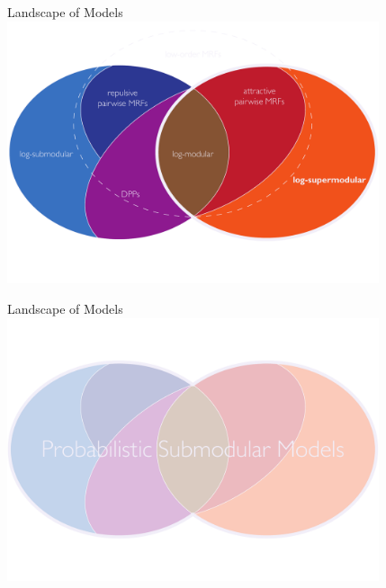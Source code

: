 \begin{frame}{Landscape of Models}
\centering
\includegraphics[width=4.3in]{figures/venn07.pdf}
\end{frame}

\begin{frame}{Landscape of Models}
\centering
\includegraphics[width=4.3in]{figures/venn08.pdf}
\end{frame}